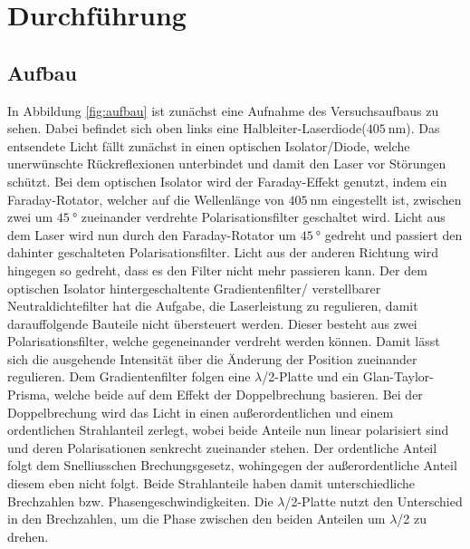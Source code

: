 \section{Durchführung}
\label{sec:Durchführung}

\subsection{Aufbau}
\label{sec:Aufbau}

In Abbildung \ref{fig:aufbau} ist zunächst eine Aufnahme des Versuchsaufbaus zu
sehen. Dabei befindet sich oben links eine Halbleiter-Laserdiode($\SI{405}{\nano\meter}$).
Das entsendete Licht fällt zunächst in einen optischen Isolator/Diode, welche
unerwünschte Rückreflexionen unterbindet und damit den Laser vor Störungen schützt.
Bei dem optischen Isolator wird der Faraday-Effekt genutzt, indem ein Faraday-Rotator,
welcher auf die Wellenlänge von $\SI{405}{\nano\meter}$ eingestellt ist,
zwischen zwei um $\SI{45}{\degree}$ zueinander verdrehte Polarisationsfilter
geschaltet wird. Licht aus dem Laser wird nun durch den Faraday-Rotator
um $\SI{45}{\degree}$ gedreht und passiert den dahinter geschalteten Polarisationsfilter.
Licht aus der anderen Richtung wird hingegen so gedreht, dass es den Filter nicht
mehr passieren kann. Der dem optischen Isolator hintergeschaltente
Gradientenfilter/ verstellbarer Neutraldichtefilter hat die Aufgabe, die Laserleistung zu regulieren,
damit darauffolgende Bauteile nicht übersteuert werden. Dieser besteht aus
zwei Polarisationsfilter, welche gegeneinander verdreht werden können. Damit lässt
sich die ausgehende Intensität über die Änderung der Position zueinander
regulieren. Dem Gradientenfilter folgen eine $\lambda$/2-Platte und ein
Glan-Taylor-Prisma, welche beide auf dem Effekt der Doppelbrechung basieren. Bei
der Doppelbrechung wird das Licht in einen außerordentlichen und einem ordentlichen
Strahlanteil zerlegt, wobei beide Anteile nun linear polarisiert sind und deren
Polarisationen senkrecht zueinander stehen. Der ordentliche Anteil folgt dem
Snelliusschen Brechungsgesetz, wohingegen der außerordentliche Anteil diesem
eben nicht folgt. Beide Strahlanteile haben damit unterschiedliche Brechzahlen
bzw. Phasengeschwindigkeiten.
Die $\lambda$/2-Platte nutzt den Unterschied in den Brechzahlen, um die Phase
zwischen den beiden Anteilen um $\lambda$/2 zu drehen.

